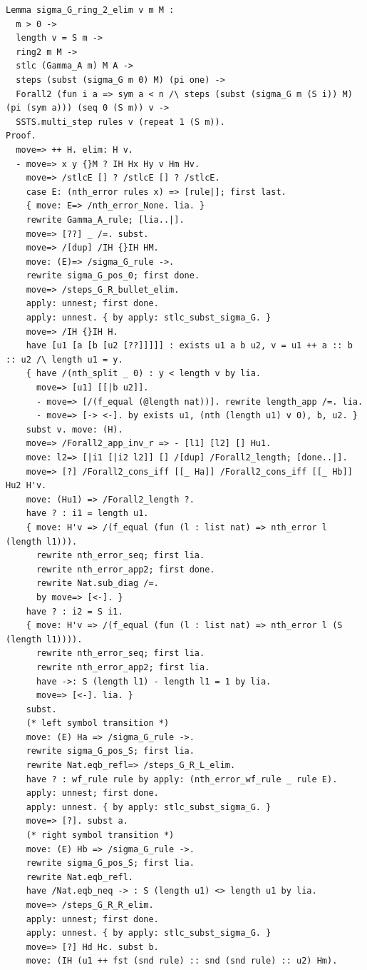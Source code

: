 \documentclass[10pt,a4paper]{amsart}
\begin{document}
\begin{lstlisting}
Lemma sigma_G_ring_2_elim v m M :
  m > 0 ->
  length v = S m ->
  ring2 m M ->
  stlc (Gamma_A m) M A ->
  steps (subst (sigma_G m 0) M) (pi one) ->
  Forall2 (fun i a => sym a < n /\ steps (subst (sigma_G m (S i)) M) (pi (sym a))) (seq 0 (S m)) v ->
  SSTS.multi_step rules v (repeat 1 (S m)).
Proof.
  move=> ++ H. elim: H v.
  - move=> x y {}M ? IH Hx Hy v Hm Hv.
    move=> /stlcE [] ? /stlcE [] ? /stlcE.
    case E: (nth_error rules x) => [rule|]; first last.
    { move: E=> /nth_error_None. lia. }
    rewrite Gamma_A_rule; [lia..|].
    move=> [??] _ /=. subst.
    move=> /[dup] /IH {}IH HM.
    move: (E)=> /sigma_G_rule ->.
    rewrite sigma_G_pos_0; first done.
    move=> /steps_G_R_bullet_elim.
    apply: unnest; first done.
    apply: unnest. { by apply: stlc_subst_sigma_G. }
    move=> /IH {}IH H.
    have [u1 [a [b [u2 [??]]]]] : exists u1 a b u2, v = u1 ++ a :: b :: u2 /\ length u1 = y.
    { have /(nth_split _ 0) : y < length v by lia.
      move=> [u1] [[|b u2]].
      - move=> [/(f_equal (@length nat))]. rewrite length_app /=. lia.
      - move=> [-> <-]. by exists u1, (nth (length u1) v 0), b, u2. }
    subst v. move: (H). 
    move=> /Forall2_app_inv_r => - [l1] [l2] [] Hu1.
    move: l2=> [|i1 [|i2 l2]] [] /[dup] /Forall2_length; [done..|].
    move=> [?] /Forall2_cons_iff [[_ Ha]] /Forall2_cons_iff [[_ Hb]] Hu2 H'v.
    move: (Hu1) => /Forall2_length ?.
    have ? : i1 = length u1.
    { move: H'v => /(f_equal (fun (l : list nat) => nth_error l (length l1))).
      rewrite nth_error_seq; first lia.
      rewrite nth_error_app2; first done.
      rewrite Nat.sub_diag /=.
      by move=> [<-]. }
    have ? : i2 = S i1.
    { move: H'v => /(f_equal (fun (l : list nat) => nth_error l (S (length l1)))).
      rewrite nth_error_seq; first lia.
      rewrite nth_error_app2; first lia.
      have ->: S (length l1) - length l1 = 1 by lia.
      move=> [<-]. lia. }
    subst.
    (* left symbol transition *)
    move: (E) Ha => /sigma_G_rule ->.
    rewrite sigma_G_pos_S; first lia.
    rewrite Nat.eqb_refl=> /steps_G_R_L_elim.
    have ? : wf_rule rule by apply: (nth_error_wf_rule _ rule E).
    apply: unnest; first done.
    apply: unnest. { by apply: stlc_subst_sigma_G. }
    move=> [?]. subst a.
    (* right symbol transition *)
    move: (E) Hb => /sigma_G_rule ->.
    rewrite sigma_G_pos_S; first lia.
    rewrite Nat.eqb_refl.
    have /Nat.eqb_neq -> : S (length u1) <> length u1 by lia.
    move=> /steps_G_R_R_elim.
    apply: unnest; first done.
    apply: unnest. { by apply: stlc_subst_sigma_G. }
    move=> [?] Hd Hc. subst b.
    move: (IH (u1 ++ fst (snd rule) :: snd (snd rule) :: u2) Hm).

\end{lstlisting}
\end{document}
